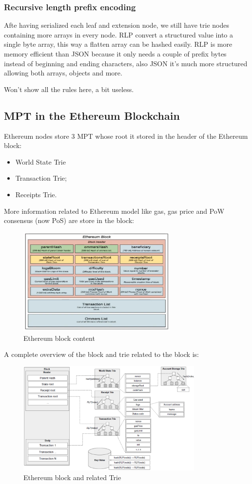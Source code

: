 \subsubsection{Recursive length prefix encoding}
Afte having serialized each leaf and extension node, we still have trie nodes containing more arrays in every node.
RLP convert a structured value into a single byte array, this way a flatten array can be hashed easily.
RLP is more memory efficient than JSON because it only needs a couple of prefix bytes instead of beginning and ending characters, also JSON it's much more structured allowing both arrays, objects and more.

Won't show all the rules here, a bit useless.

\subsection{MPT in the Ethereum Blockchain}
Ethereum nodes store 3 MPT whose root it stored in the header of the Ethereum block:
\begin{itemize}
    \item World State Trie
    \item Transaction Trie;
    \item Receipts Trie.
\end{itemize}
More information related to Ethereum model like gas, gas price and PoW consensus (now PoS) are store in the block:
\begin{figure}[H]
    \centering
    \includegraphics[width=300px]{images/7_Ethereum/03.png}
    \caption{Ethereum block content}
\end{figure}

A complete overview of the block and trie related to the block is:
\begin{figure}[H]
    \centering
    \includegraphics[width=350px]{images/7_Ethereum/04.png}
    \caption{Ethereum block and related Trie}
\end{figure}

